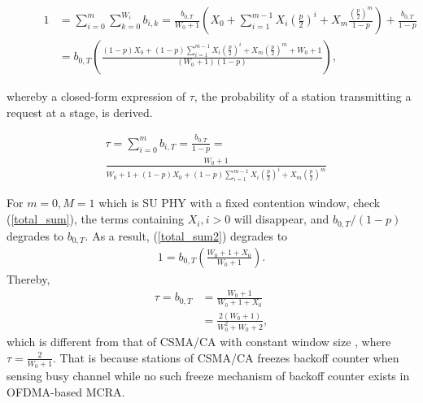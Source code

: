 \documentclass[journal]{IEEEtran}
\newcounter{MYtempeqncnt}
\begin{document}
\begin{figure}[!t]
\begin{align}
1 &= \sum_{i=0}^m \sum_{k=0}^{W_i}b_{i,k} 
 = \frac{b_{0,T}}{W_0+1}\left( X_0 + \sum_{i=1}^{m-1}X_i\left( \frac{p}{2}\right)^i + X_m\frac{\left( \frac{p}{2}\right)^m}{1-p}\right) + \frac{b_{0,T}}{1-p}\label{total_sum}\\
& = b_{0,T}\left( \frac{(1-p)X_0+(1-p) \sum_{i=1}^{m-1}X_i\left( \frac{p}{2}\right)^i+X_m\left( \frac{p}{2}\right)^m+W_0+1}{(W_0+1)(1-p)}\right), \label{total_sum2}
\end{align}
\hrulefill
\end{figure}

whereby a closed-form expression of $\tau$, the probability of a station transmitting a request at a stage, is derived.

\begin{align}
\label{tau_general}
&\tau = \sum_{i=0}^m b_{i,T} = \frac{b_{0,T}}{1-p} = \nonumber \\
&\frac{W_0+1}{W_0+1+(1-p)X_0+(1-p) \sum_{i=1}^{m-1}X_i\left( \frac{p}{2}\right)^i+X_m\left( \frac{p}{2}\right)^m}
\end{align}

For $m=0, M=1$ which is SU PHY with a fixed contention window, check (\ref{total_sum}), the terms containing $X_i, i>0$ will disappear, and $b_{0,T}/(1-p)$ degrades to $b_{0,T}$.
As a result, (\ref{total_sum2}) degrades to 
\begin{align}
1 = b_{0,T}\left( \frac{W_0+1+X_0}{W_0+1}\right).
\end{align}
Thereby, 
\begin{align}
\tau = b_{0,T} &= \frac{W_0+1}{W_0+1+X_0} \nonumber\\
				&= \frac{2(W_0+1)}{W_0^2+W_0+2},
\label{tau_W0}
\end{align}
which is different from that of CSMA/CA with constant window size \cite{ho1996performance}, where $\tau=\frac{2}{W_0+1}$.
That is because stations of CSMA/CA freezes backoff counter when sensing busy channel while no such freeze mechanism of backoff counter exists in OFDMA-based MCRA. 
\end{document}
